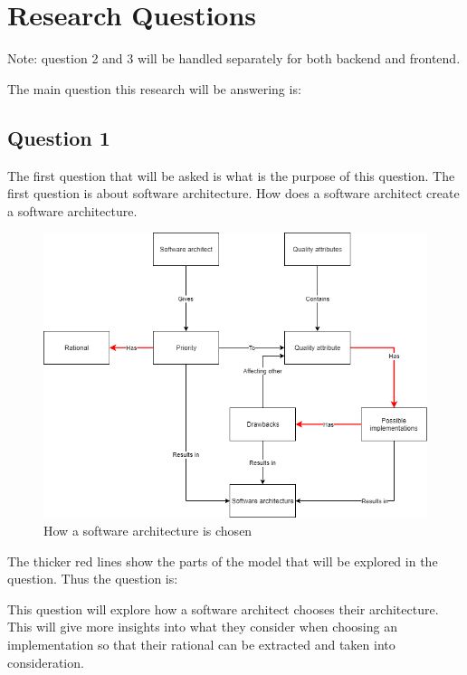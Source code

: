 \section{Research Questions}
Note: question 2 and 3 will be handled separately for both backend and frontend.

The main question this research will be answering is:


\subsection{Question 1}
\label{sec:Question1}
The first question that will be asked is what is the purpose of this question. The first question is about software architecture. How does a software architect create a software architecture.

\begin{figure}[H]
	\includegraphics[width=\linewidth]{creating_architecture.png}
	\caption{How a software architecture is chosen}
\end{figure}

The thicker red lines show the parts of the model that will be explored in the question. Thus the question is:


This question will explore how a software architect chooses their architecture. This will give more insights into what they consider when choosing an implementation so that their rational can be extracted and taken into consideration.


